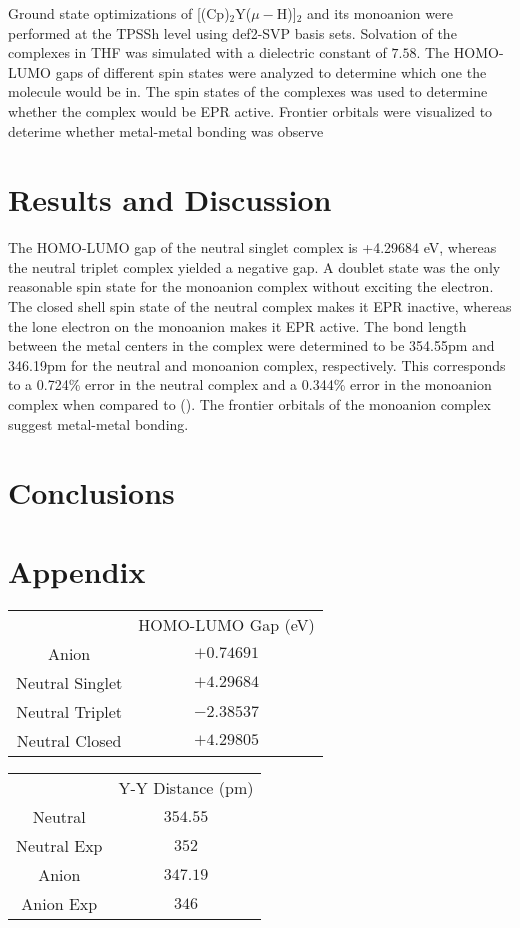 \documentclass{article}
\begin{document}
Ground state optimizations of [(Cp)$_2$Y($\mu - $H)]$_2$ and its monoanion were performed at the TPSSh level using def2-SVP basis sets.
Solvation of the complexes in THF was simulated with a dielectric constant of $7.58$. 
The HOMO-LUMO gaps of different spin states were analyzed to determine which one the molecule would be in.
The spin states of the complexes was used to determine whether the complex would be EPR active.
Frontier orbitals were visualized to deterime whether metal-metal bonding was observe

\section{Results and Discussion} %

The HOMO-LUMO gap of the neutral singlet complex is +4.29684 eV, whereas the neutral triplet complex yielded a negative gap.
A doublet state was the only reasonable spin state for the monoanion complex without exciting the electron.
The closed shell spin state of the neutral complex makes it EPR inactive, whereas the lone electron on the monoanion makes it EPR active.
The bond length between the metal centers in the complex were determined to be 354.55pm and 346.19pm for the neutral and monoanion complex, respectively.
This corresponds to a 0.724\% error in the neutral complex and a 0.344\% error in the monoanion complex when compared to ().
The frontier orbitals of the monoanion complex suggest metal-metal bonding. %

\section{Conclusions} %

\section*{Appendix}
\begin{tabular}{cc}
	 & HOMO-LUMO Gap (eV) \\
	Anion & $+0.74691$ \\
	Neutral Singlet & $+4.29684$ \\
	Neutral Triplet & $-2.38537$ \\
	Neutral Closed & $+4.29805$
\end{tabular}

\begin{tabular}{cc}
	 & Y-Y Distance (pm) \\
	Neutral & $354.55$ \\
	Neutral Exp & $352$ \\
	Anion & $347.19$ \\
	Anion Exp & $346$
\end{tabular}
\end{document}

